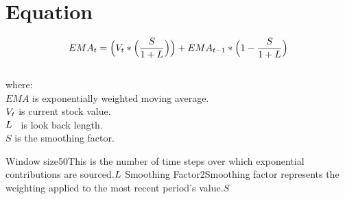 \documentclass{article}
\begin{document}
\logo
{} %
\tblofcontents


\section{Equation}
\begin{equation}
    EMA_{t} = \Big(V_{t} * \Big(\frac{S}{1 + L}\Big)\Big) + EMA_{t-1} * \Big(1-\frac{S}{1 + L}\Big)
\end{equation}
\\

where: \\

$EMA$ is exponentially weighted moving average. \\

$V_{t}$ is current stock value. \\

$L$ \ is look back length. \\

$S$ is the smoothing factor.


{Window size}{50}{This is the number of time steps over which exponential contributions are sourced.}{$L$}
{Smoothing Factor}{2}{Smoothing factor represents the weighting applied to the most recent period’s value.}{$S$}
\stoptable

\keyterms
\furtherlinks
\end{document}

